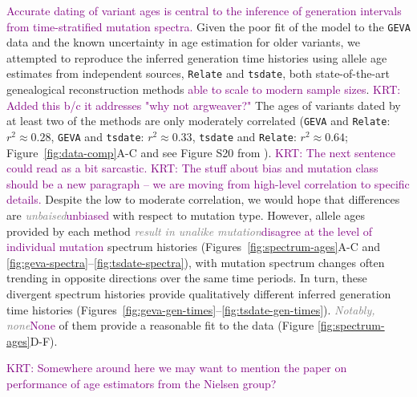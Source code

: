 \documentclass[]{article}
\newcommand{\krtcomment}[1]{{\textcolor{purple}{KRT: #1}}}
\newcommand{\krtedit}[2]{{\emph{\textcolor{gray}{#1}}}{\textcolor{purple}{#2}}}
\newcommand{\GEVA}{\texttt{GEVA}\xspace}
\newcommand{\tsdate}{\texttt{tsdate}\xspace}
\newcommand{\relate}{\texttt{Relate}\xspace}
\begin{document}
\krtedit{}{Accurate dating of variant ages is central to the inference of generation
intervals from time-stratified mutation spectra.}
Given the poor fit of the model to the \GEVA data and the known uncertainty in
age estimation for older variants, we attempted to reproduce the inferred
generation time histories using allele age estimates from independent sources,
\relate \citep{speidel2019method} and \tsdate \citep{wohns2022unified}, both
state-of-the-art genealogical reconstruction methods \krtedit{}{able to scale to modern sample sizes}. 
\krtcomment{Added this b/c it addresses "why not argweaver?"}
The ages of variants
dated by at least two of the methods are only moderately correlated (\GEVA and
    \relate: $r^2 \approx 0.28$, \GEVA and \tsdate: $r^2 \approx 0.33$, \tsdate
and \relate: $r^2 \approx 0.64$; Figure~\ref{fig:data-comp}A-C and see Figure
S20 from \citet{wohns2022unified}). \krtcomment{The next sentence could read as a bit sarcastic.}
\krtcomment{The stuff about bias and mutation class should be a new paragraph --
we are moving from high-level correlation to specific details.}
Despite the low to moderate correlation, we
would hope that differences are \krtedit{unbaised}{unbiased} with respect to mutation type.
However, allele ages provided by each method \krtedit{result in unalike mutation}
{disagree at the level of individual mutation}
spectrum histories (Figures~\ref{fig:spectrum-ages}A-C and
\ref{fig:geva-spectra}--\ref{fig:tsdate-spectra}), with mutation spectrum
changes often trending in opposite directions over the same time periods. In
turn, these divergent spectrum histories provide qualitatively different
inferred generation time histories
(Figures~\ref{fig:geva-gen-times}--\ref{fig:tsdate-gen-times}). \krtedit{Notably, none}{None}
of them provide a reasonable fit to the data (Figure
\ref{fig:spectrum-ages}D-F).

\krtcomment{Somewhere around here we may want to mention the paper on performance of age estimators from the Nielsen group?}
\end{document}
